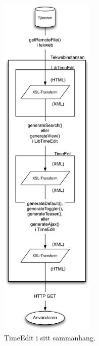 \begin{figure}
  \begin{center}
    \includegraphics[width=45mm]{timeeditchart.pdf}
  \end{center}
  \caption{TimeEdit i sitt sammanhang.}
\end{figure}

